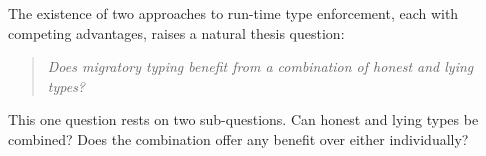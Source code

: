 
The existence of two approaches to run-time type enforcement,
 each with competing advantages, raises a natural thesis question:

\begin{quote}
\emph{Does migratory typing benefit from a combination of honest and lying types?}
\end{quote}

This one question rests on two sub-questions.
Can honest and lying types be combined?
Does the combination offer any benefit over either individually?


